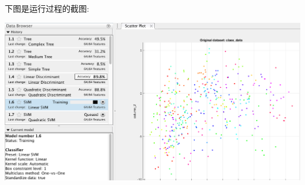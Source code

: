 下图是运行过程的截图:
	
		\begin{center}
	\begin{minipage}[t]{\linewidth}
	\center
	{
	\includegraphics[width=\textwidth]{Img/class_training} 
	}
	\end{minipage}
	\medskip
	\end{center}

	
		\newpage
